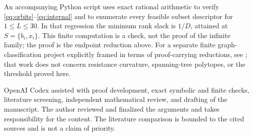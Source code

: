 \documentclass[11pt]{article}
\begin{document}
An accompanying Python script uses exact rational arithmetic to verify
\eqref{eq:orbits}--\eqref{eq:internal} and to enumerate every feasible subset
descriptor for $1\leq L\leq30$.  In that regression the minimum rank slack
is $1/D$, attained at $S=\{b_i,x_i\}$.  This finite computation is a check,
not the proof of the infinite family; the proof is the endpoint reduction
above.  For a separate finite graph-classification project explicitly framed
in terms of proof-carrying reductions, see \cite{Zeng2026SSRN7374858}; that
work does not concern resistance curvature, spanning-tree polytopes, or the
threshold proved here.

OpenAI Codex assisted with proof development, exact symbolic and finite
checks, literature screening, independent mathematical review, and drafting
of the manuscript.  The author reviewed and finalized the arguments and
takes responsibility for the content.  The literature comparison is bounded
to the cited sources and is not a claim of priority.



\end{document}
